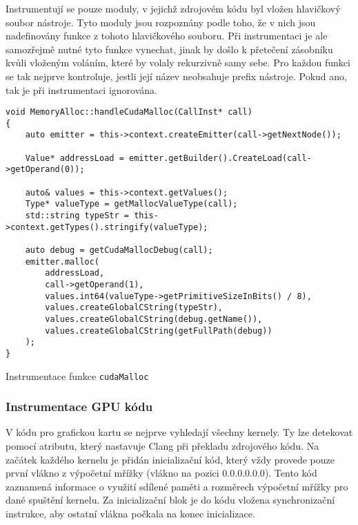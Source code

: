 Instrumentují se pouze moduly, v jejichž zdrojovém kódu byl vložen hlavičkový soubor nástroje. Tyto moduly jsou rozpoznány podle toho, že v nich jsou nadefinovány funkce z tohoto hlavičkového souboru. Při instrumentaci je ale samozřejmě nutné tyto funkce vynechat, jinak by došlo k přetečení zásobníku kvůli vloženým voláním, které by volaly rekurzivně samy sebe. Pro každou funkci se tak nejprve kontroluje, jestli její název neobsahuje prefix nástroje. Pokud ano, tak je při instrumentaci ignorována.

\begin{listing}
\begin{verbatim}
void MemoryAlloc::handleCudaMalloc(CallInst* call)
{
	auto emitter = this->context.createEmitter(call->getNextNode());
	
	Value* addressLoad = emitter.getBuilder().CreateLoad(call->getOperand(0));
	
	auto& values = this->context.getValues();
	Type* valueType = getMallocValueType(call);
	std::string typeStr = this->context.getTypes().stringify(valueType);

	auto debug = getCudaMallocDebug(call);
	emitter.malloc(
		addressLoad,
		call->getOperand(1),
		values.int64(valueType->getPrimitiveSizeInBits() / 8),
		values.createGlobalCString(typeStr),
		values.createGlobalCString(debug.getName()),
		values.createGlobalCString(getFullPath(debug))
	);
}
\end{verbatim}
\caption{Instrumentace funkce \texttt{cudaMalloc}}
\label{code:cudamallocinstrument}
\end{listing}
 
\subsubsection*{Instrumentace GPU kódu}
V kódu pro grafickou kartu se nejprve vyhledají všechny kernely. Ty lze detekovat pomocí atributu, který nastavuje Clang při překladu zdrojového kódu. Na začátek každého kernelu je přidán inicializační kód, který vždy provede pouze první vlákno z výpočetní mřížky (vlákno na pozici $0.0.0.0.0.0$). Tento kód zaznamená informace o využití sdílené paměti a rozměrech výpočetní mřížky pro dané spuštění kernelu. Za inicializační blok je do kódu vložena synchronizační instrukce, aby ostatní vlákna počkala na konec inicializace.


